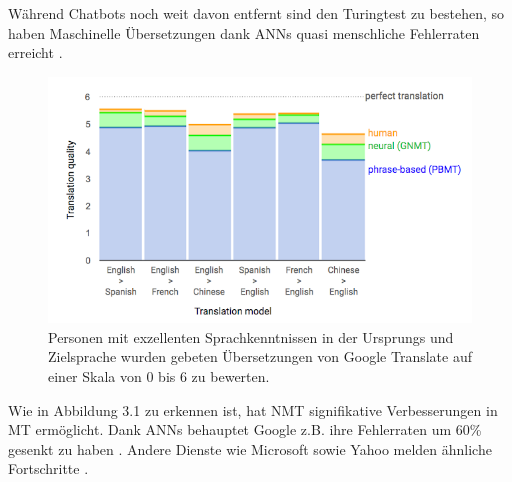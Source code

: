 \documentclass{thesisclass}
\begin{document}
 Während Chatbots noch weit davon entfernt sind den \gls{Turingtest} zu bestehen, so haben Maschinelle Übersetzungen dank \gls{ANN}s quasi menschliche Fehlerraten erreicht \cite{googleaiblog_2016}.
 
\begin{figure}[H]
  \center
  \includegraphics[width=\textwidth]{images/MTGoogle.png}
  \caption{Personen mit exzellenten Sprachkenntnissen in der Ursprungs und Zielsprache wurden gebeten Übersetzungen von Google Translate auf einer Skala von 0 bis 6 zu bewerten. \cite{googleaiblog_2016}}
  \label{fig:GoogleTranslate Performance}
\end{figure}

Wie in Abbildung 3.1 zu erkennen ist, hat \gls{NMT} signifikative Verbesserungen in \gls{MT} ermöglicht. Dank \gls{ANN}s behauptet Google z.B. ihre Fehlerraten um 60\% gesenkt zu haben \cite{wu2016google}. Andere Dienste wie Microsoft sowie Yahoo melden ähnliche Fortschritte \cite{Microsoft2018}.
\end{document}
